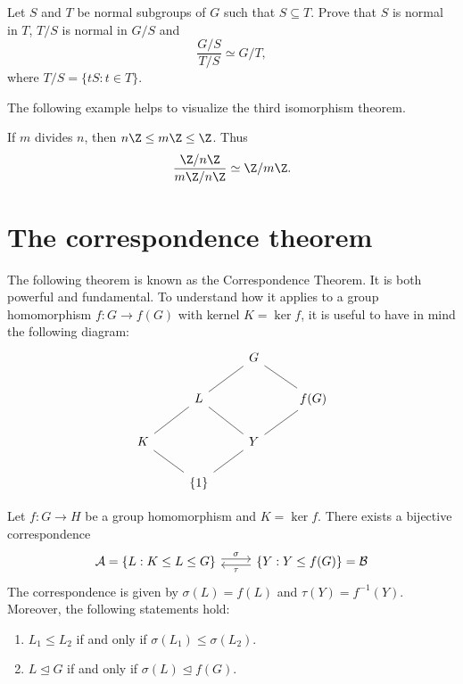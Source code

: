 \begin{bonus}
\label{xca:third}
Let $S$ and $T$ be normal subgroups of $G$ such that 
$S\subseteq T$. Prove that $S$ is normal in $T$, 
$T/S$ is normal in $G/S$ and 
\[
\frac{G/S}{T/S}\simeq G/T,
\]
where $T/S=\{tS:t\in T\}$.
\end{bonus}

The following example helps to visualize the third isomorphism
theorem. 

\begin{example}
If $m$ divides $n$, then $n\Z\leq m\Z\leq\Z$. Thus 
\[
\frac{\Z/n\Z}{m\Z/n\Z}\simeq\Z/m\Z.
\]
\end{example}

\section{The correspondence theorem} 

The following theorem is known as the Correspondence Theorem.
It is both powerful and fundamental. To understand how it applies 
to a group homomorphism
$f\colon G\to f(G)$ with kernel $K=\ker f$, it is useful 
to have in mind the following diagram: 
\[
\begin{tikzcd}
        && G \\
        & L && {f(G)} \\
        K && Y \\
        & {\{1\}}
        \arrow[no head, from=1-3, to=2-4]
        \arrow[no head, from=1-3, to=2-2]
        \arrow[no head, from=2-2, to=3-1]
        \arrow[no head, from=3-1, to=4-2]
        \arrow[no head, from=2-2, to=3-3]
        \arrow[no head, from=3-3, to=4-2]
        \arrow[no head, from=2-4, to=3-3]
\end{tikzcd}
\]

\begin{theorem}
Let $f\colon G\to H$ be a group homomorphism and $K=\ker f$. There exists
a bijective correspondence 
\[\begin{tikzcd}
        {\mathcal{A}=\{L:K\leq L\leq G\}} & {\{Y:Y\leq f(G)\}=\mathcal{B}}
        \arrow["\sigma", shift left=1, from=1-1, to=1-2]
        \arrow["\tau", shift left=1, from=1-2, to=1-1]
\end{tikzcd}
\]
The correspondence is given by $\sigma(L)=f(L)$ and $\tau(Y)=f^{-1}(Y)$. Moreover, the following statements hold: 
\begin{enumerate}
\item $L_1\leq L_2$ if and only if $\sigma(L_1)\leq \sigma(L_2)$.
\item $L\unlhd G$ if and only if $\sigma(L)\unlhd f(G)$.
\end{enumerate}
\end{theorem}


